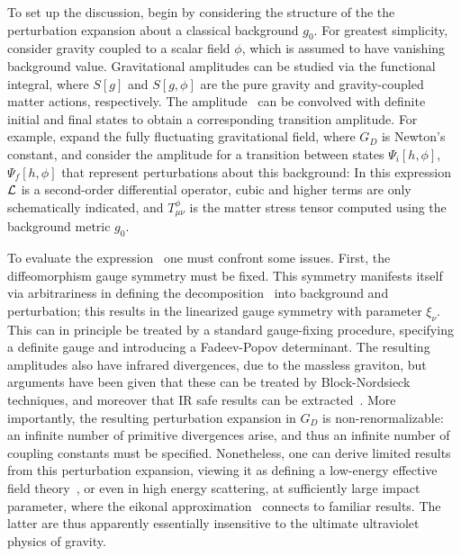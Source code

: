 To set up the discussion, begin by considering the structure of the the perturbation expansion about a classical background $g_0$.  For greatest simplicity, consider gravity coupled to a scalar field $\phi$, which is assumed to have vanishing background value.  Gravitational amplitudes can be studied via the functional integral,
%
\eqn{}
%
where $S[g]$ and $S[g,\phi]$ are the pure gravity and gravity-coupled matter actions, respectively. The amplitude \gravfunc\ can be convolved with definite initial and final states to obtain a corresponding transition amplitude.  For example, expand the fully fluctuating gravitational field,
%
\eqn{}
%
where $G_D$ is Newton's constant, and consider the amplitude for a transition between states $\Psi_i[h,\phi]$, $\Psi_f[h,\phi]$ that represent perturbations about this background:
%
\eqn{}
%
In this expression ${\cal L}$ is a second-order differential operator, cubic and higher terms are only schematically indicated, and $T^\phi_{\mu\nu}$ is the matter stress tensor computed using the background metric $g_0$.  

To evaluate the expression \gravpert\ one must confront some issues.  First, the diffeomorphism gauge symmetry must be fixed.  This symmetry manifests itself via arbitrariness in defining the decomposition \gravexp\ into background and perturbation; this results in the linearized gauge symmetry
%
\eqn{}
%
with parameter $\xi_\nu$.  This can in principle be treated by a standard gauge-fixing procedure, specifying a definite gauge and introducing a Fadeev-Popov determinant.  The resulting amplitudes also have infrared divergences, due to the massless graviton, but arguments have been given that these can be treated by Block-Nordsieck techniques, and moreover that IR safe results can be extracted~.  More importantly, the resulting perturbation expansion in $G_D$ is non-renormalizable: an infinite number of primitive divergences arise, and thus an infinite number of coupling constants must be specified.  Nonetheless, one can derive limited results from this perturbation expansion, viewing it as defining a low-energy effective field theory~, or even in high energy scattering, at sufficiently large impact parameter, where the eikonal approximation~ connects to familiar results.  The latter are thus  apparently essentially insensitive to the ultimate ultraviolet physics of gravity.

